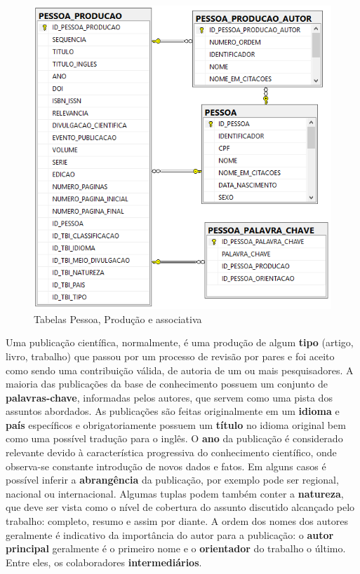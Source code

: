 \documentclass[12pt]{article}
\begin{document}
\begin{center}
  \begin{figure}[ht]
    \centering
    \includegraphics[width=.65\textwidth]{database.png}
    \caption{Tabelas Pessoa, Produção e associativa \cite{prass2019parser}}
    \label{fig:database}
  \end{figure}
 \end{center}

Uma publicação científica, normalmente, é uma produção de algum \textbf{tipo} (artigo, livro, trabalho) que passou por um processo de 
revisão por pares e foi aceito como sendo uma contribuição válida, de autoria de um ou mais pesquisadores. A maioria das 
publicações da base de conhecimento possuem um conjunto de \textbf{palavras-chave}, informadas pelos autores, que servem como uma pista 
dos assuntos abordados. As publicações são feitas originalmente em um \textbf{idioma} e \textbf{país} específicos e 
obrigatoriamente possuem um \textbf{título} no idioma original bem como uma possível tradução para o inglês. O \textbf{ano} da 
publicação é considerado relevante devido à característica progressiva do conhecimento científico, onde observa-se constante 
introdução de novos dados e fatos. Em alguns casos é possível inferir a \textbf{abrangência} da publicação, por exemplo pode 
ser regional, nacional ou internacional. Algumas tuplas podem também conter a \textbf{natureza}, que deve ser vista como o 
nível de cobertura do assunto discutido alcançado pelo trabalho: completo, resumo e assim por diante. A ordem dos nomes dos 
autores geralmente é indicativo da importância do autor para a publicação: o \textbf{autor principal} geralmente é o primeiro 
nome e o \textbf{orientador} do trabalho o último. Entre eles, os colaboradores \textbf{intermediários}.
\end{document}
